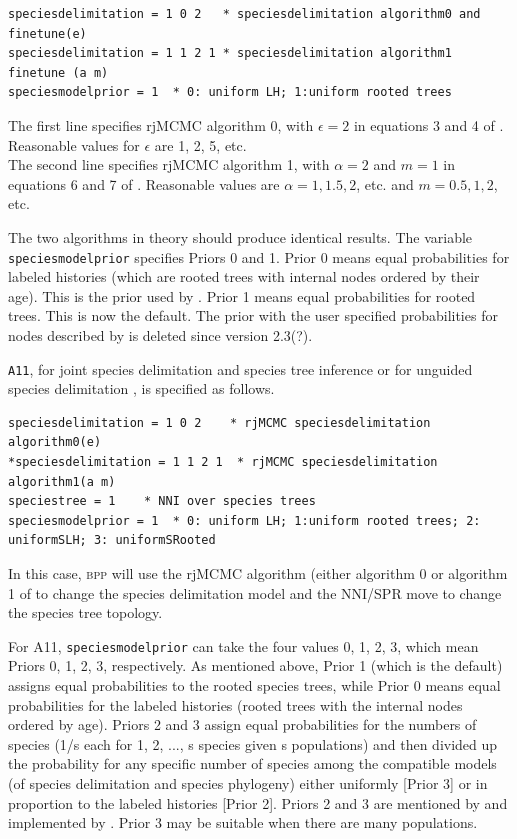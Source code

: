 \documentclass[a4paper]{book}
\numberwithin{equation}{section} \renewcommand{\baselinestretch}{0.55}
\begin{document}
\begin{verbatim}
speciesdelimitation = 1 0 2   * speciesdelimitation algorithm0 and finetune(e)
speciesdelimitation = 1 1 2 1 * speciesdelimitation algorithm1 finetune (a m)
speciesmodelprior = 1  * 0: uniform LH; 1:uniform rooted trees
\end{verbatim}

The first line specifies rjMCMC algorithm 0, with $\epsilon = 2$ in
equations 3 and 4 of \cite{Yang2010}.  Reasonable values for
$\epsilon$ are 1, 2, 5, etc. \\ The second line specifies rjMCMC
algorithm 1, with $ \alpha = 2$ and $m = 1$ in equations 6 and 7 of
\cite{Yang2010}. Reasonable values are $\alpha = 1, 1.5, 2$, etc. and
$m = 0.5, 1, 2$, etc.

The two algorithms in theory should produce identical results.  The
variable \texttt{speciesmodelprior} specifies Priors 0 and 1.  Prior 0
means equal probabilities for labeled histories (which are rooted
trees with internal nodes ordered by their age).  This is the prior
used by \cite[][eq.~2]{Yang2010}.  Prior 1 means equal probabilities
for rooted trees.  This is now the default.  The prior with the user
specified probabilities for nodes described by \cite{Rannala2013} is
deleted since version 2.3(?).

\texttt{A11}, for joint species delimitation and species tree
inference or for unguided species delimitation \cite{Yang2014a}, is
specified as follows.
\begin{verbatim}
speciesdelimitation = 1 0 2    * rjMCMC speciesdelimitation algorithm0(e)
*speciesdelimitation = 1 1 2 1  * rjMCMC speciesdelimitation algorithm1(a m)
speciestree = 1    * NNI over species trees
speciesmodelprior = 1  * 0: uniform LH; 1:uniform rooted trees; 2: uniformSLH; 3: uniformSRooted
\end{verbatim}

In this case, \textsc{bpp} will use the rjMCMC algorithm (either
algorithm 0 or algorithm 1 of \cite{Yang2010} to change the species
delimitation model and the NNI/SPR move to change the species tree
topology.

For A11, \texttt{speciesmodelprior} can take the four values 0, 1, 2,
3, which mean Priors 0, 1, 2, 3, respectively.  As mentioned above,
Prior 1 (which is the default) assigns equal probabilities to the
rooted species trees, while Prior 0 means equal probabilities for the
labeled histories (rooted trees with the internal nodes ordered by
age).  Priors 2 and 3 assign equal probabilities for the numbers of
species (1/s each for 1, 2, ..., s species given s populations) and
then divided up the probability for any specific number of species
among the compatible models (of species delimitation and species
phylogeny) either uniformly [Prior 3] or in proportion to the labeled
histories [Prior 2].  Priors 2 and 3 are mentioned by \cite{Yang2014a}
and implemented by \cite{Yang2015}.  Prior 3 may be suitable when
there are many populations.
\end{document}
